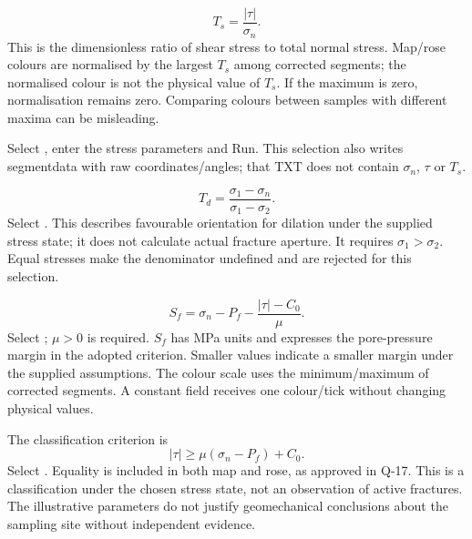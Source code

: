\begin{equation}T_s=\frac{|\tau|}{\sigma_n}.\end{equation}
This is the dimensionless ratio of shear stress to total normal stress. Map/rose colours are normalised by the largest \(T_s\) among corrected segments; the normalised colour is not the physical value of \(T_s\). If the maximum is zero, normalisation remains zero. Comparing colours between samples with different maxima can be misleading.

Select , enter the stress parameters and Run. This selection also writes segmentdata with raw coordinates/angles; that TXT does not contain \(\sigma_n\), \(\tau\) or \(T_s\).

\begin{equation}T_d=\frac{\sigma_1-\sigma_n}{\sigma_1-\sigma_2}.\end{equation}
Select . This describes favourable orientation for dilation under the supplied stress state; it does not calculate actual fracture aperture. It requires \(\sigma_1>\sigma_2\). Equal stresses make the denominator undefined and are rejected for this selection.

\begin{equation}S_f=\sigma_n-P_f-\frac{|\tau|-C_0}{\mu}.\end{equation}
Select ; \(\mu>0\) is required. \(S_f\) has MPa units and expresses the pore-pressure margin in the adopted criterion. Smaller values indicate a smaller margin under the supplied assumptions. The colour scale uses the minimum/maximum of corrected segments. A constant field receives one colour/tick without changing physical values.

The classification criterion is
\begin{equation}|\tau|\geq\mu(\sigma_n-P_f)+C_0.\label{eq:csf}\end{equation}
Select . Equality is included in both map and rose, as approved in Q-17. This is a classification under the chosen stress state, not an observation of active fractures. The illustrative parameters do not justify geomechanical conclusions about the sampling site without independent evidence.


